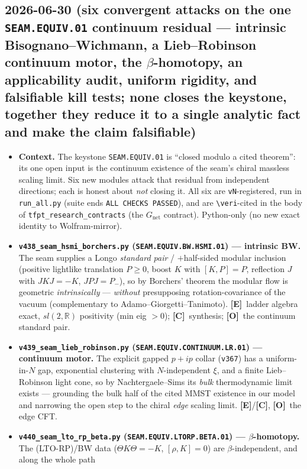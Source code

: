 \documentclass[11pt]{article}
\providecommand{\mE}{\textbf{[E]}}\providecommand{\mC}{\textbf{[C]}}
\providecommand{\mO}{\textbf{[O]}}\providecommand{\mX}{\textbf{[X]}}
\begin{document}
\subsection*{2026-06-30 (six convergent attacks on the one \texttt{SEAM.EQUIV.01} continuum residual --- intrinsic Bisognano--Wichmann, a Lieb--Robinson continuum motor, the $\beta$-homotopy, an applicability audit, uniform rigidity, and falsifiable kill tests; none closes the keystone, together they reduce it to a single analytic fact and make the claim falsifiable)}
\begin{itemize}
\item \textbf{Context.} The keystone \texttt{SEAM.EQUIV.01} is ``closed modulo a cited theorem'': its one open
input is the continuum existence of the seam's chiral massless scaling limit. Six new modules attack that residual
from independent directions; each is honest about \emph{not} closing it. All six are \texttt{vN}-registered, run in
\texttt{run\_all.py} (suite ends \texttt{ALL CHECKS PASSED}), and are \texttt{\textbackslash veri}-cited in the
body of \texttt{tfpt\_research\_contracts} (the $G_{\mathrm{net}}$ contract). Python-only (no new exact identity to
Wolfram-mirror).
\item \textbf{\texttt{v438\_seam\_hsmi\_borchers.py} (\texttt{SEAM.EQUIV.BW.HSMI.01}) --- intrinsic BW.} The seam
supplies a Longo \emph{standard pair} / $+$half-sided modular inclusion (positive lightlike translation $P\ge0$,
boost $K$ with $[K,P]{=}P$, reflection $J$ with $JKJ{=}{-}K$, $JPJ{=}P_-$), so by Borchers' theorem the modular
flow is geometric \emph{intrinsically} --- \emph{without} presupposing rotation-covariance of the vacuum
(complementary to Adamo--Giorgetti--Tanimoto). \mE\ ladder algebra exact, $sl(2,\mathbb{R})$ positivity (min eig
$>0$); \mC\ synthesis; \mO\ the continuum standard pair.
\item \textbf{\texttt{v439\_seam\_lieb\_robinson.py} (\texttt{SEAM.EQUIV.CONTINUUM.LR.01}) --- continuum motor.}
The explicit gapped $p{+}ip$ collar (\texttt{v367}) has a uniform-in-$N$ gap, exponential clustering with
$N$-independent $\xi$, and a finite Lieb--Robinson light cone, so by Nachtergaele--Sims its \emph{bulk}
thermodynamic limit exists --- grounding the bulk half of the cited MMST existence in our model and narrowing the
open step to the chiral \emph{edge} scaling limit. \mE/\mC, \mO\ the edge CFT.
\item \textbf{\texttt{v440\_seam\_lto\_rp\_beta.py} (\texttt{SEAM.EQUIV.LTORP.BETA.01}) --- $\beta$-homotopy.}
The (LTO-RP)/BW data ($\Theta K\Theta{=}{-}K$, $[\rho,K]{=}0$) are $\beta$-independent, and along the whole path

\end{itemize}
\end{document}

